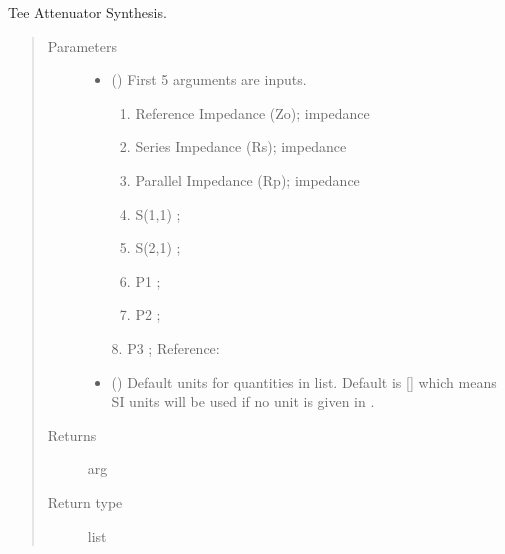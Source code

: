 \documentclass[letterpaper,10pt,english]{sphinxmanual}
\begin{document}

\begin{fulllineitems}
\label{\detokenize{components:components.Tee_Attenuator_Synthesis}}
Tee Attenuator Synthesis.
\begin{quote}\begin{description}
\item[{Parameters}] \leavevmode\begin{itemize}
\item {} 
 () \textendash{} 
First 5 arguments are inputs.
\begin{enumerate}
%
\item {} 
Reference Impedance (Zo); impedance

\item {} 
Series Impedance (Rs); impedance

\item {} 
Parallel Impedance (Rp); impedance

\item {} 
S(1,1) ;

\item {} 
S(2,1) ;

\item {} 
P1 ;

\item {} 
P2 ;

\end{enumerate}

8. P3 ;
Reference:


\item {} 
 (\sphinxstyleliteralemphasis{\sphinxupquote{, }}) \textendash{} Default units for quantities in  list. Default is {[}{]} which means SI units will be used if no unit is given in .

\end{itemize}

\item[{Returns}] \leavevmode
arg

\item[{Return type}] \leavevmode
list

\end{description}\end{quote}

\end{fulllineitems}
\end{document}

